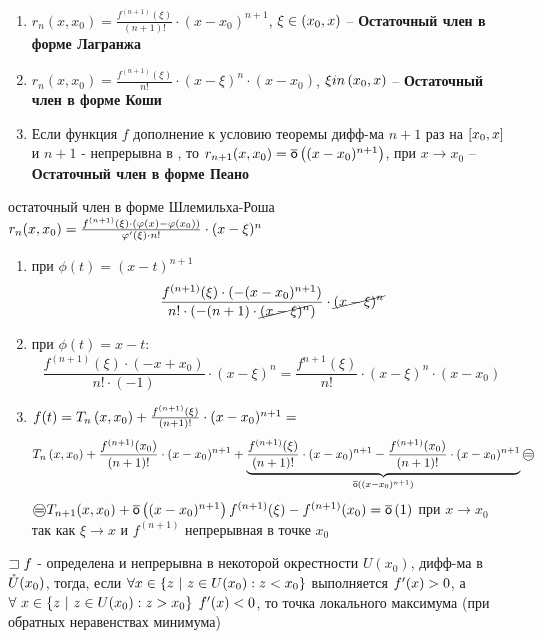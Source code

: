 \begin{sledsv}
	\begin{enumerate}
		\item $r_n(x,x_0) = \frac{f^{(n+1)}(\xi)}{(n+1)!}\cdot (x-x_0)^{n+1}$, $\xi \in \left( x_0,x\right)$ -- \textbf{Остаточный член в форме Лагранжа}
		\item $r_n(x,x_0) = \frac{f^{(n+1)}(\xi)}{n!}\cdot (x-\xi)^{n}\cdot (x-x_0)$, $\xi in \left( x_0, x\right)$ -- \textbf{Остаточный член в форме Коши}
		\item Если функция $f$ дополнение к условию теоремы дифф-ма $n+1$ раз на $\left[ x_0,x\right]$ и $n+1$ - непрерывна в , то $r_{n+1}(x,x_0) = \overline{\mathsf{o}}\left( (x-x_0)^{n+1}\right)$, при $x \to x_0$  -- \textbf{Остаточный член в форме Пеано}
	\end{enumerate}

	\begin{dokvo}
		остаточный член в форме Шлемильха-Роша $r_n(x,x_0) = \frac{f^{(n+1)}(\xi)  \cdot (\varphi(x)-\varphi(x_0))}{\varphi^{\prime}(\xi) \cdot n!}\cdot (x-\xi)^{n}$
		\begin{enumerate}
			\item при $\phi(t) = (x-t)^{n+1}$
			$$\frac{f^{(n+1)}(\xi) \cdot (-(x-x_0)^{n+1})}{n! \cdot (-(n+1)\cdot \cancel{(x - \xi)^{n}})}\cdot \cancel{(x-\xi)^{n}}$$
			\item при $\phi(t) = x - t:$
			$$\frac{f^{(n+1)}(\xi)\cdot (-x + x_0)}{n! \cdot (-1)}\cdot (x - \xi)^n = \frac{f^{n+1}(\xi)}{n!}\cdot(x-\xi)^{n}\cdot (x - x_0)$$
			\item $f(t) = T_n\left( x,x_0\right) + \frac{f^{(n+1)}(\xi)}{(n+1)!}\cdot (x-x_0)^{n+1} =$
			$$T_n\skobk{x,x_0} + \frac{f^{(n+1)}(x_0)}{(n+1)!}\cdot (x-x_0)^{n+1} + \underbrace{\frac{f^{(n+1)}(\xi)}{(n+1)!}\cdot (x-x_0)^{n+1} - \frac{f^{(n+1)}(x_0)}{(n+1)!}\cdot (x-x_0)^{n+1}}_{\omaloe{(x-x_0)^{n+1}}} \oeq$$
			$\oeq T_{n+1}(x,x_0) + \omaloe{ (x-x_0)^{n+1}} f^{(n+1)}(\xi)-f^{(n+1)}(x_0)=\omaloe{1}$ при $x\to x_0$ так как $\xi \to x$ и $f^{(n+1)}$ непрерывная в точке $x_0$
		\end{enumerate}
	\end{dokvo}
\end{sledsv}

\begin{proofs}
 $\sqsupset f$ - определена и непрерывна в некоторой окрестности $U(x_0)$, дифф-ма в $\mathring{U}(x_0)$, тогда, если $\forall x \in \left\{ z \ | \ z \in U(x_0) : z < x_0\right\}$ выполняется $f^{\prime}(x) > 0$, а $\forall \ x \in \left\{ z \ | \ z \in U(x_0): z > x_0\right\}$
$f^{\prime}(x) < 0$, то  точка локального максимума (при обратных неравенствах минимума)
\end{proofs}
\newpage
